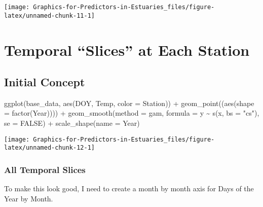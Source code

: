 \documentclass[
]{article}
\newenvironment{Shaded}{\begin{snugshade}}{\end{snugshade}}
\newcommand{\AttributeTok}[1]{\textcolor[rgb]{0.77,0.63,0.00}{#1}}
\newcommand{\ConstantTok}[1]{\textcolor[rgb]{0.00,0.00,0.00}{#1}}
\newcommand{\FunctionTok}[1]{\textcolor[rgb]{0.00,0.00,0.00}{#1}}
\newcommand{\NormalTok}[1]{#1}
\newcommand{\SpecialCharTok}[1]{\textcolor[rgb]{0.00,0.00,0.00}{#1}}
\newcommand{\StringTok}[1]{\textcolor[rgb]{0.31,0.60,0.02}{#1}}
\begin{document}
\begin{center}\texttt{[image: Graphics-for-Predictors-in-Estuaries\_files/figure-latex/unnamed-chunk-11-1]} \end{center}

\hypertarget{temporal-slices-at-each-station}{%
\section{Temporal ``Slices'' at Each
Station}\label{temporal-slices-at-each-station}}

\hypertarget{initial-concept}{%
\subsection{Initial Concept}\label{initial-concept}}

\begin{Shaded}
\begin{Highlighting}[]
\FunctionTok{ggplot}\NormalTok{(base\_data, }\FunctionTok{aes}\NormalTok{(DOY, Temp, }\AttributeTok{color =}\NormalTok{ Station)) }\SpecialCharTok{+}
  \FunctionTok{geom\_point}\NormalTok{((}\FunctionTok{aes}\NormalTok{(}\AttributeTok{shape =} \FunctionTok{factor}\NormalTok{(Year)))) }\SpecialCharTok{+}
  \FunctionTok{geom\_smooth}\NormalTok{(}\AttributeTok{method =} \StringTok{\textquotesingle{}gam\textquotesingle{}}\NormalTok{, }\AttributeTok{formula =}\NormalTok{ y }\SpecialCharTok{\textasciitilde{}} \FunctionTok{s}\NormalTok{(x, }\AttributeTok{bs =} \StringTok{"cs"}\NormalTok{), }\AttributeTok{se =} \ConstantTok{FALSE}\NormalTok{) }\SpecialCharTok{+}
  \FunctionTok{scale\_shape}\NormalTok{(}\AttributeTok{name =} \StringTok{\textquotesingle{}Year\textquotesingle{}}\NormalTok{)}
\end{Highlighting}
\end{Shaded}

\begin{center}\texttt{[image: Graphics-for-Predictors-in-Estuaries\_files/figure-latex/unnamed-chunk-12-1]} \end{center}

\hypertarget{all-temporal-slices}{%
\subsubsection{All Temporal Slices}\label{all-temporal-slices}}

To make this look good, I need to create a month by month axis for Days
of the Year by Month.
\end{document}
